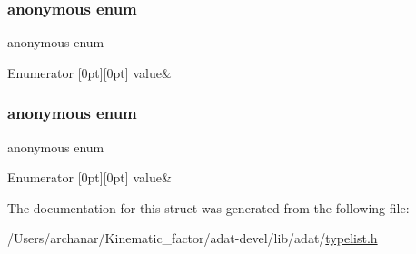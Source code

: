 \subsubsection{\texorpdfstring{anonymous enum}{anonymous enum}}
{\footnotesize\ttfamily anonymous enum}

\begin{DoxyEnumFields}{Enumerator}
[0pt][0pt]{}\mbox{\label{structUtil_1_1TL_1_1Length_3_01NullType_01_4_a4c0260a5aca87ef464143138cafa1cc1a61d625fe199814f6443a5c37c7b429a4}} 
value&\\
\hline

\end{DoxyEnumFields}
\mbox{\label{structUtil_1_1TL_1_1Length_3_01NullType_01_4_a4c0260a5aca87ef464143138cafa1cc1}} 
\subsubsection{\texorpdfstring{anonymous enum}{anonymous enum}}
{\footnotesize\ttfamily anonymous enum}

\begin{DoxyEnumFields}{Enumerator}
[0pt][0pt]{}\mbox{\label{structUtil_1_1TL_1_1Length_3_01NullType_01_4_a4c0260a5aca87ef464143138cafa1cc1a61d625fe199814f6443a5c37c7b429a4}} 
value&\\
\hline

\end{DoxyEnumFields}


The documentation for this struct was generated from the following file\+:\begin{DoxyCompactItemize}
\item 
/\+Users/archanar/\+Kinematic\+\_\+factor/adat-\/devel/lib/adat/\mbox{\hyperlink{adat-devel_2lib_2adat_2typelist_8h}{typelist.\+h}}\end{DoxyCompactItemize}

